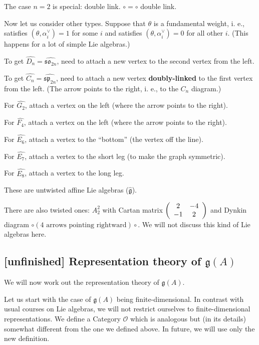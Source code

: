 \documentclass[etingof-lie.tex]{subfiles}
\begin{document}
The case $n=2$ is special: double link. $\circ=\circ$ double link.

Now let us consider other types. Suppose that $\theta$ is a fundamental
weight, i. e., satisfies $\left(  \theta,\alpha_{i}^{\vee}\right)  =1$ for
some $i$ and satisfies $\left(  \theta,\alpha_{i}^{\vee}\right)  =0$ for all
other $i$. (This happens for a lot of simple Lie algebras.)

To get $\widehat{D_{n}}=\widehat{\mathfrak{so}_{2n}}$, need to attach a new
vertex to the second vertex from the left.

To get $\widehat{C_{n}}=\widehat{\mathfrak{sp}_{2n}}$, need to attach a new
vertex \textbf{doubly-linked} to the first vertex from the left. (The arrow
points to the right, i. e., to the $C_{n}$ diagram.)

For $\widehat{G_{2}}$, attach a vertex on the left (where the arrow points to
the right).

For $\widehat{F_{4}}$, attach a vertex on the left (where the arrow points to
the right).

For $\widehat{E_{6}}$, attach a vertex to the ``bottom'' (the vertex off the line).

For $\widehat{E_{7}}$, attach a vertex to the short leg (to make the graph symmetric).

For $\widehat{E_{8}}$, attach a vertex to the long leg.

These are untwisted affine Lie algebras ($\widehat{\mathfrak{g}}$).

There are also twisted ones: $A_{2}^{2}$ with Cartan matrix $\left(
\begin{array}
[c]{cc}%
2 & -4\\
-1 & 2
\end{array}
\right)  $ and Dynkin diagram $\circ\left(  4\text{ arrows pointing
rightward}\right)  \circ$. We will not discuss this kind of Lie algebras here.

\subsection{\textbf{[unfinished]} Representation theory of
\texorpdfstring{$\mathfrak{g}\left(  A\right)  $}{g(A)}}

We will now work out the representation theory of $\mathfrak{g}\left(
A\right)  $.

Let us start with the case of $\mathfrak{g}\left(  A\right)  $ being
finite-dimensional. In contrast with usual courses on Lie algebras, we will
not restrict ourselves to finite-dimensional representations. We define a
Category $\mathcal{O}$ which is analogous but (in its details) somewhat
different from the one we defined above. In future, we will use only the new definition.
\end{document}
